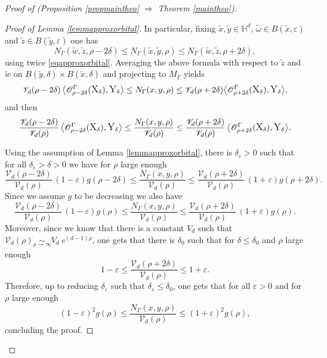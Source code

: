 \documentclass[JEP,XML,SOM,Unicode,NoFloatCountersInSection,published]{cedram}
\let\mathcal\mathscr
\let\epsilon\varepsilon
\theoremstyle{plain}
\theoremstyle{definition}
\newcommand{\equivaut}[1]{\underset{#1}{\sim}}
\begin{document}
\begin{proof}[Proof of (Proposition \ref{propmaintheo} $\Rightarrow$ Theorem \ref{maintheo})]
\begin{proof}[Proof of Lemma \ref{lemmapproxorbital}]
\noindent
In particular, fixing $\tilde{x},\tilde{y} \in \mathbb{H}^d$, $ \tilde{\omega} \in B(\tilde{x},\epsilon)$ and $\tilde{z} \in B(\tilde{y},\epsilon)$ one has
\[
N_{\Gamma}(\tilde{w},\tilde{z}, \rho - 2 \delta) \le N_{\Gamma}(\tilde{x},\tilde{y}, \rho) \le N_{\Gamma}(\tilde{w},\tilde{z}, \rho + 2 \delta),
\]
using twice \eqref{eqapproxorbital}. Averaging the above formula with respect to $\tilde{z}$ and $\tilde{w}$ on $B(\tilde{y},\delta) \times B(\tilde{x},\delta) $ and projecting to $M_{\Gamma}$ yields
\[
\mathcal{V}_d(\rho - 2 \delta) \left< \mathcal{O}^{\Gamma}_{\rho - 2 \delta}(\text{\large{X}}_{\delta}), \text{\large{Y}}_{\delta} \right> \le N_{\Gamma}(x,y,\rho) \le \mathcal{V}_d(\rho + 2 \delta) \bigl< \mathcal{O}^{\Gamma}_{\rho + 2 \delta}(\text{\large{X}}_{\delta}), \text{\large{Y}}_{\delta} \bigr>,
\]
and then
\[
\frac{\mathcal{V}_d(\rho - 2 \delta)}{\mathcal{V}_d(\rho)} \left< \mathcal{O}^{\Gamma}_{\rho - 2 \delta}(\text{\large{X}}_{\delta}), \text{\large{Y}}_{\delta} \right> \le \frac{N_{\Gamma}(x,y,\rho)}{\mathcal{V}_d(\rho)} \le \frac{\mathcal{V}_d(\rho + 2 \delta)}{\mathcal{V}_d(\rho)}\, \bigl< \mathcal{O}^{\Gamma}_{\rho + 2 \delta}(\text{\large{X}}_{\delta}), \text{\large{Y}}_{\delta} \bigr>.
\]

Using the assumption of Lemma \ref{lemmapproxorbital}, there is $\delta_{\epsilon} > 0$ such that for all $\delta_{\epsilon} >\delta > 0$ we have for $\rho$ large enough
\[
\frac{\mathcal{V}_d(\rho - 2 \delta)}{\mathcal{V}_d(\rho)}\, (1 - \epsilon) g(\rho - 2 \delta) \le \frac{ N_{\Gamma}(x,y,\rho)}{\mathcal{V}_d(\rho)} \le \frac{\mathcal{V}_d(\rho + 2 \delta)}{\mathcal{V}_d(\rho)}\, (1 + \epsilon) g (\rho + 2 \delta).
\]
Since we assume $g$ to be decreasing we also have
\[
\frac{\mathcal{V}_d(\rho - 2 \delta)}{\mathcal{V}_d(\rho)}\, (1 - \epsilon) g(\rho) \le \frac{ N_{\Gamma}(x,y,\rho)}{\mathcal{V}_d(\rho)} \le \frac{\mathcal{V}_d(\rho + 2 \delta)}{\mathcal{V}_d(\rho)}\, (1 + \epsilon) g (\rho).
\]
Moreover, since we know that there is a constant $V_d$ such that $\mathcal{V}_d(\rho) \equivaut{\rho \to \infty} V_d \ e^{(d-1) \rho}$, one gets that there is $\delta_0$ such that for $\delta \le \delta_0$ and $\rho$ large enough
\[
1 - \epsilon \le \frac{\mathcal{V}_d(\rho + 2 \delta)}{\mathcal{V}_d(\rho)} \le 1 + \epsilon.
\]
Therefore, up to reducing $\delta_{\epsilon}$ such that $\delta_{\epsilon} \le \delta_0$, one gets that for all $\epsilon > 0$ and for $\rho$ large enough
\[
(1 - \epsilon)^2 g(\rho) \le \frac{ N_{\Gamma}(x,y,\rho)}{\mathcal{V}_d(\rho)} \le (1 + \epsilon)^2 g (\rho),
\]
concluding the proof.
\end{proof}


\end{proof}
\end{document}
